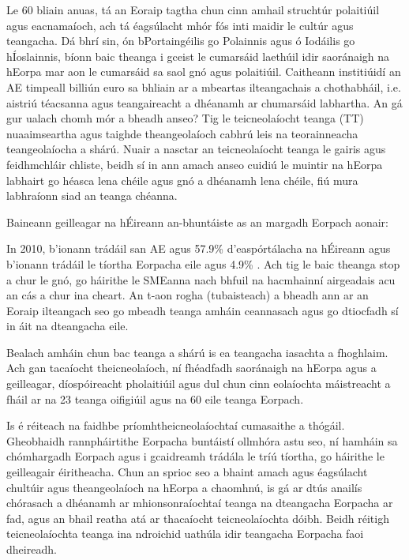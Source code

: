 \begin{multicols}{2}
Le 60 bliain anuas, tá an Eoraip tagtha chun cinn amhail struchtúr polaitiúil agus eacnamaíoch, ach tá éagsúlacht mhór fós inti maidir le cultúr agus teangacha. Dá bhrí sin, ón bPortaingéilis go Polainnis agus ó Iodáilis go hÍoslainnis, bíonn baic theanga i gceist le cumarsáid laethúil idir saoránaigh na hEorpa mar aon le cumarsáid sa saol gnó agus polaitiúil. Caitheann institiúidí an AE timpeall billiún euro sa bhliain ar a mbeartas ilteangachais a chothabháil, i.e. aistriú téacsanna agus teangaireacht a dhéanamh ar chumarsáid labhartha. An gá gur ualach chomh mór a bheadh anseo? Tig le teicneolaíocht teanga (TT) nua\-aimseartha agus taighde theangeolaíoch cabhrú leis na teorainneacha teangeolaíocha a shárú. Nuair a nasctar an teicneolaíocht teanga le gairis agus feidhmchláir chliste, beidh sí in ann amach anseo cuidiú le muintir na hEorpa labhairt go héasca lena chéile agus gnó a dhéanamh lena chéile, fiú mura labhraíonn siad an teanga chéanna.  


Baineann geilleagar na hÉireann an-bhuntáiste as an margadh Eorpach aonair: 

In 2010, b’ionann trádáil san AE agus 57.9\% d’easpórtálacha na hÉireann agus b’ionann trádáil le tíortha Eorpacha eile agus 4.9\% \cite{csoirishtrade}.
Ach tig le baic theanga stop a chur le gnó, go háirithe le SMEanna nach bhfuil na hacmhainní airgeadais acu an cás a chur ina cheart.
An t-aon rogha (tubaisteach) a bheadh ann ar an Eoraip ilteangach seo go mbeadh teanga amháin ceannasach agus go dtiocfadh sí in áit na dteangacha eile.

Bealach amháin chun bac teanga a shárú is ea teangacha iasachta a fhoghlaim. Ach gan tacaíocht theicneolaíoch, ní fhéadfadh saoránaigh na hEorpa agus a geilleagar, díospóireacht pholaitiúil agus dul chun cinn eolaíochta máistreacht a fháil ar na 23 teanga oifigiúil agus na 60 eile teanga Eorpach. 

Is é réiteach na faidhbe príomhtheicneolaíochtaí cumasaithe a thógáil. Gheobhaidh rannpháirtithe Eorpacha buntáistí ollmhóra astu seo, ní hamháin sa chómhargadh Eorpach agus i gcaidreamh trádála le tríú tíortha, go háirithe le geilleagair éiritheacha.  Chun an sprioc seo a bhaint amach agus éagsúlacht chultúir agus theangeolaíoch na hEorpa a chaomhnú, is gá ar dtús anailís chórasach a dhéanamh ar mhionsonraíochtaí teanga na dteangacha Eorpacha ar fad, agus an bhail reatha atá ar thacaíocht teicneolaíochta dóibh. Beidh réitigh teicneolaíochta teanga ina ndroichid uathúla idir teangacha Eorpacha faoi dheireadh.  


\end{multicols}
